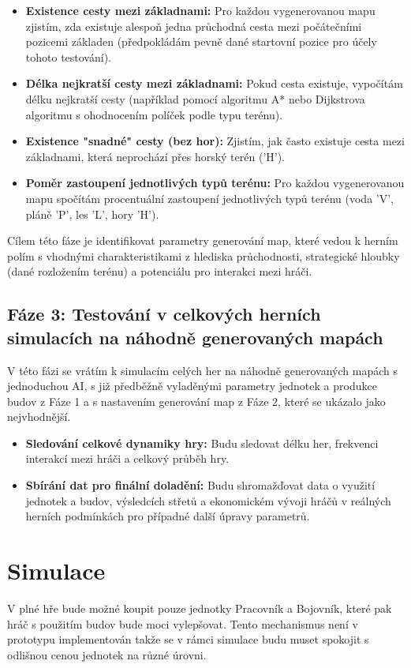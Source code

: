 \begin{itemize}
\item \textbf{Existence cesty mezi základnami:} Pro každou vygenerovanou mapu zjistím, zda existuje alespoň jedna průchodná cesta mezi počátečními pozicemi základen (předpokládám pevně dané startovní pozice pro účely tohoto testování).
\item \textbf{Délka nejkratší cesty mezi základnami:} Pokud cesta existuje, vypočítám délku nejkratší cesty (například pomocí algoritmu A* nebo Dijkstrova algoritmu s ohodnocením políček podle typu terénu).
\item \textbf{Existence "snadné" cesty (bez hor):} Zjistím, jak často existuje cesta mezi základnami, která neprochází přes horský terén ('H').
\item \textbf{Poměr zastoupení jednotlivých typů terénu:} Pro každou vygenerovanou mapu spočítám procentuální zastoupení jednotlivých typů terénu (voda 'V', pláně 'P', les 'L', hory 'H').
\end{itemize}

Cílem této fáze je identifikovat parametry generování map, které vedou k herním polím s vhodnými charakteristikami z hlediska průchodnosti, strategické hloubky (dané rozložením terénu) a potenciálu pro interakci mezi hráči.

\subsection{Fáze 3: Testování v celkových herních simulacích na náhodně generovaných mapách}

V této fázi se vrátím k simulacím celých her na náhodně generovaných mapách s jednoduchou AI, s již předběžně vyladěnými parametry jednotek a produkce budov z Fáze 1 a s nastavením generování map z Fáze 2, které se ukázalo jako nejvhodnější.

\begin{itemize}
\item \textbf{Sledování celkové dynamiky hry:} Budu sledovat délku her, frekvenci interakcí mezi hráči a celkový průběh hry.
\item \textbf{Sbírání dat pro finální doladění:} Budu shromažďovat data o využití jednotek a budov, výsledcích střetů a ekonomickém vývoji hráčů v reálných herních podmínkách pro případné další úpravy parametrů.
\end{itemize}

\section{Simulace}
V plné hře bude možné koupit pouze jednotky Pracovník a Bojovník, které pak hráč s použitím budov bude moci vylepšovat. Tento mechanismus není v prototypu implementován takže se v rámci simulace budu muset spokojit s odlišnou cenou jednotek na různé úrovni.

